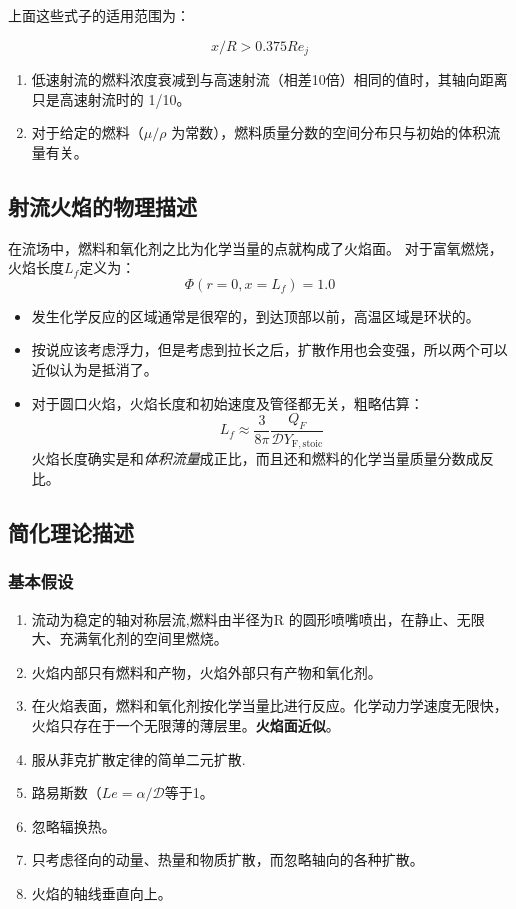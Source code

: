 上面这些式子的适用范围为：

\begin{equation}
    x/R > 0.375 Re_j
\end{equation}

\begin{enumerate}
    \item 低速射流的燃料浓度衰减到与高速射流（相差10倍）相同的值时，其轴向距离只是高速射流时的 1/10。
    \item 对于给定的燃料（\(\mu/\rho\) 为常数），燃料质量分数的空间分布只与初始的体积流量有关。
\end{enumerate}

\subsection{射流火焰的物理描述}
在流场中，燃料和氧化剂之比为化学当量的点就构成了火焰面。
对于富氧燃烧，火焰长度\(L_f\)定义为：
\begin{equation}
    \Phi(r=0, x=L_f) = 1.0
\end{equation}

\begin{itemize}
    \item 发生化学反应的区域通常是很窄的，到达顶部以前，高温区域是环状的。
    \item 按说应该考虑浮力，但是考虑到拉长之后，扩散作用也会变强，所以两个可以近似认为是抵消了。
    \item 对于圆口火焰，火焰长度和初始速度及管径都无关，粗略估算：
    \begin{equation}
        L_f\approx \frac{3}{8\pi}\frac{Q_F}{\mathcal{D}Y_\mathrm{F,stoic}}
    \end{equation}火焰长度确实是和\textit{体积流量}成正比，而且还和燃料的化学当量质量分数成反比。
\end{itemize}

\subsection{简化理论描述}

\subsubsection{基本假设}

\begin{enumerate}
    \item 流动为稳定的轴对称层流,燃料由半径为R 的圆形喷嘴喷出，在静止、无限大、充满氧化剂的空间里燃烧。
    \item 火焰内部只有燃料和产物，火焰外部只有产物和氧化剂。
    \item 在火焰表面，燃料和氧化剂按化学当量比进行反应。化学动力学速度无限快，火焰只存在于一个无限薄的薄层里。\textbf{火焰面近似}。
    \item 服从菲克扩散定律的简单二元扩散.
    \item 路易斯数（\(Le=\alpha/\mathcal{D}\)等于1。
    \item 忽略辐换热。
    \item 只考虑径向的动量、热量和物质扩散，而忽略轴向的各种扩散。
    \item 火焰的轴线垂直向上。
\end{enumerate}

